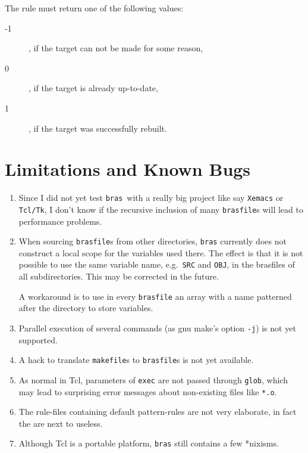 \documentclass[12pt]{article}
\newcommand{\bras}{\texttt{bras}}
\begin{document}
The rule must return one of the following values:
\begin{description}
\item[-1], if the target can not be made for some reason,
\item[0], if the target is already up-to-date,
\item[1], if the target was successfully rebuilt.
\end{description}

\section{Limitations and Known Bugs}


\begin{enumerate}
\item
Since I did not yet test \bras\ with a really big project like say
\texttt{Xemacs} or \texttt{Tcl/Tk}, I don't know if the recursive
inclusion of many \texttt{brasfile}s will lead to performance
problems.

\item
When sourcing \texttt{brasfile}s from other directories, \bras{}
currently does not construct a local scope for the variables used
there. The effect is that it is not possible to use the same variable
name, e.g.\ \texttt{SRC} and \texttt{OBJ}, in the brasfiles
of all subdirectories. This may be corrected in the future.

A workaround is to use in every \texttt{brasfile} an array with a name
patterned after the directory to store variables.

\item 
Parallel execution of several commands (as gnu make's option
\texttt{-j}) is not yet supported.

\item
A hack to translate \texttt{makefile}s to \texttt{brasfile}s is not
yet available.

\item
As normal in Tcl, parameters of \texttt{exec} are not passed through
\texttt{glob}, which may lead to surprising error messages about
non-existing files like \texttt{*.o}.

\item
The rule-files containing default pattern-rules are not very
elaborate, in fact the are next to useless.

\item
Although Tcl is a portable platform, \bras{} still contains a few
*nixisms.


\end{enumerate}
\end{document}
